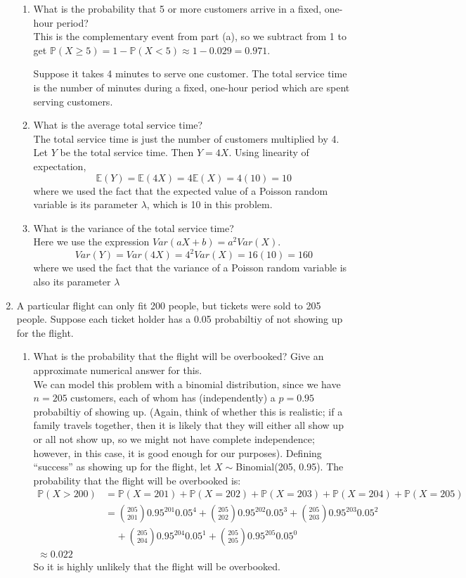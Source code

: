 \documentclass[12pt]{article}
\def\P{{\mathbb P}}
\def\E{{\mathbb E}}
\begin{document}
\begin{enumerate}
\begin{enumerate}
\item What is the probability that 5 or more customers arrive in a fixed, one-hour period?\\
This is the complementary event from part (a), so we subtract from 1 to get $\P(X \geq 5) = 1 - \P(X < 5) \approx 1 - 0.029 = 0.971$.

Suppose it takes 4 minutes to serve one customer. The total service time is the number of minutes during a fixed, one-hour period which are spent serving customers.
\item What is the average total service time?\\

The total service time is just the number of customers multiplied by 4. Let $Y$ be the total service time. Then $Y = 4X$. Using linearity of expectation,
\[
\E(Y) = \E(4X) = 4\E(X) = 4(10) = 10
\]
where we used the fact that the expected value of a Poisson random variable is its parameter $\lambda$, which is 10 in this problem.

\item What is the variance of the total service time?\\
Here we use the expression $Var(aX + b) = a^2 Var(X)$.
\[
Var(Y) = Var(4X)= 4^2 Var(X) = 16(10) = 160
\]
where we used the fact that the variance of a Poisson random variable is also its parameter $\lambda$
\end{enumerate}

\item A particular flight can only fit 200 people, but tickets were sold to 205 people. Suppose each ticket holder has a 0.05 probabiltiy of not showing up for the flight.
\begin{enumerate}
\item What is the probability that the flight will be overbooked? Give an approximate numerical answer for this.\\

We can model this problem with a binomial distribution, since we have $n = 205$ customers, each of whom has (independently) a $p =0.95$ probabiltiy of showing up. (Again, think of whether this is realistic; if a family travels together, then it is likely that they will either all show up or all not show up, so we might not have complete independence; however, in this case, it is good enough for our purposes). Defining ``success'' as showing up for the flight, let $X \sim$Binomial(205, 0.95). The probability that the flight will be overbooked is:
\begin{align*}
\P(X > 200) &= \P(X = 201) + \P(X = 202) + \P(X = 203) + \P(X = 204) + \P(X = 205) \\
&= \binom{205}{201} 0.95^{201} 0.05^4 +  \binom{205}{202} 0.95^{202} 0.05^3 + \binom{205}{203} 0.95^{203} 0.05^2 \\
&\:\:\:\:\:+ \binom{205}{204} 0.95^{204} 0.05^1 + \binom{205}{205} 0.95^{205} 0.05^0 \\
\approx 0.022   
\end{align*}
So it is highly unlikely that the flight will be overbooked.


\end{enumerate}
\end{enumerate}
\end{document}
